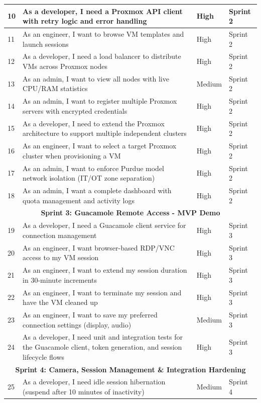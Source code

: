\begin{longtable}{|p{}|p{}|p{}|p{}|}
10 & As a developer, I need a Proxmox API client with retry logic and error handling & High & Sprint 2 \\ \hline
11 & As an engineer, I want to browse VM templates and launch sessions & High & Sprint 2 \\ \hline
12 & As a developer, I need a load balancer to distribute VMs across Proxmox nodes & High & Sprint 2 \\ \hline
13 & As an admin, I want to view all nodes with live CPU/RAM statistics & Medium & Sprint 2 \\ \hline
14 & As an admin, I want to register multiple Proxmox servers with encrypted credentials & High & Sprint 2 \\ \hline
15 & As a developer, I need to extend the Proxmox architecture to support multiple independent clusters & High & Sprint 2 \\ \hline
16 & As an engineer, I want to select a target Proxmox cluster when provisioning a VM & High & Sprint 2 \\ \hline
17 & As an admin, I want to enforce Purdue model network isolation (IT/OT zone separation) & High & Sprint 2 \\ \hline
18 & As an admin, I want a complete dashboard with quota management and activity logs & High & Sprint 2 \\ \hline
\multicolumn{4}{|c|}{\textbf{Sprint 3: Guacamole Remote Access - MVP Demo}} \\ \hline
19 & As a developer, I need a Guacamole client service for connection management & High & Sprint 3 \\ \hline
20 & As an engineer, I want browser-based RDP/VNC access to my VM session & High & Sprint 3 \\ \hline
21 & As an engineer, I want to extend my session duration in 30-minute increments & High & Sprint 3 \\ \hline
22 & As an engineer, I want to terminate my session and have the VM cleaned up & High & Sprint 3 \\ \hline
23 & As an engineer, I want to save my preferred connection settings (display, audio) & Medium & Sprint 3 \\ \hline
24 & As a developer, I need unit and integration tests for the Guacamole client, token generation, and session lifecycle flows & High & Sprint 3 \\ \hline
\multicolumn{4}{|c|}{\textbf{Sprint 4: Camera, Session Management \& Integration Hardening}} \\ \hline
25 & As a developer, I need idle session hibernation (suspend after 10 minutes of inactivity) & Medium & Sprint 4 \\ \hline

\end{longtable}
